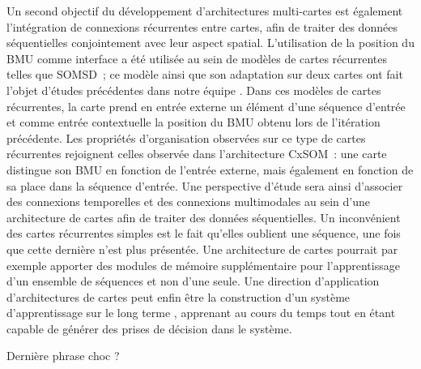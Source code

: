Un second objectif du développement d'architectures multi-cartes est également l'intégration de connexions récurrentes entre cartes, afin de traiter des données séquentielles conjointement avec leur aspect spatial. 
L'utilisation de la position du BMU comme interface a été utilisée au sein de modèles de cartes récurrentes telles que SOMSD~; ce modèle ainsi que son adaptation sur deux cartes ont fait l'objet d'études précédentes dans notre équipe \parencite{baheux_towards_2014, fix20}. 
Dans ces modèles de cartes récurrentes, la carte prend en entrée externe un élément d'une séquence d'entrée et comme entrée contextuelle la position du BMU obtenu lors de l'itération précédente.
Les propriétés d'organisation observées sur ce type de cartes récurrentes rejoignent celles observée dans l'architecture CxSOM~: une carte distingue son BMU en fonction de l'entrée externe, mais également en fonction de sa place dans la séquence d'entrée.
Une perspective d'étude sera ainsi d'associer des connexions temporelles et des connexions multimodales au sein d'une architecture de cartes afin de traiter des données séquentielles.
Un inconvénient des cartes récurrentes simples est le fait qu'elles oublient une séquence, une fois que cette dernière n'est plus présentée. 
Une architecture de cartes pourrait par exemple apporter des modules de mémoire supplémentaire pour l'apprentissage d'un ensemble de séquences et non d'une seule.
Une direction d'application d'architectures de cartes peut enfin être la construction d'un système d'apprentissage \og sur le long terme \fg{}, apprenant au cours du temps tout en étant capable de générer des prises de décision dans le système.


Dernière phrase choc ?




